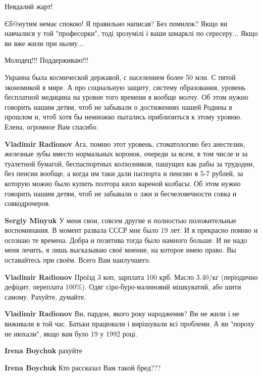 \begin{itemize}
Невдалий жарт!

Єб@нутим немає спокою!
Я правильно написав? Без помилок?
Якщо ви навчалися у той "професорки", тоді зрозумілі і ваши шмарклі по
сересеру... Якщо ви вже жили при ньому...

 
Молодец!!! Поддерживаю!!!

Украина была космической державой, с населением более 50 млн. С пятой
экономикой в мире. А про социальную защиту, систему образования, уровень
бесплатной медицина на уровне того времени я вообще молчу. Об этом нужно
говорить нашим детям, чтоб не забывали о достижениях нашей Родины в прошлом и,
чтоб хотя бы немножко пытались приблизиться к этому уровню. Елена, огромное Вам
спасибо.

\begin{itemize} %
\textbf{Vladimir Radionov} Ага, помню этот уровень, стоматологию без анестезии, железные зубы вместо нормальных коронок, очереди за всем, в том числе и за туалетной бумагой, беспаспортных колхозников, пашущих как рабы за трудодни, без пенсии вообще, а когда им таки дали паспорта и пенсию в 5-7 рублей, за которую можно было купить полтора кило вареной колбасы. Об этом нужно говорить нашим детям, чтоб не забывали о лжи и бесчеловечности совка и совкодрочеров.

\textbf{Sergiy Minyuk} У меня свои, совсем другие и полностью положительные
воспоминания. В момент развала СССР мне было 19 лет. И я прекрасно помню и
осознаю те времена. Добра и позитива тогда было намного больше. И не надо меня
лечить, я лишь высказываю своё мнение, на которое имею право. Вы оставайтесь
при своём. Всего Вам наилучшего.

\textbf{Vladimir Radionov} Проїзд 3 коп, зарплата 100 крб. Масло 3.40/кг
(періодично дефіцит, переплата 100\%). Одяг сіро-буро-малиновий мішкуватий, або
шити самому. Рахуйте, думайте.

\textbf{Vladimir Radionov} Ви, пардон, якого року народження? Ви не жили і не виживали в той час. Батьки працювали і вирішували всі проблеми. А ви "пороху не нюхали", якщо вам було 19 у 1992 році.

\textbf{Irena Boychuk} рахуйте

\textbf{Irena Boychuk} Кто рассказал Вам такой бред???


\end{itemize}
\end{itemize}
